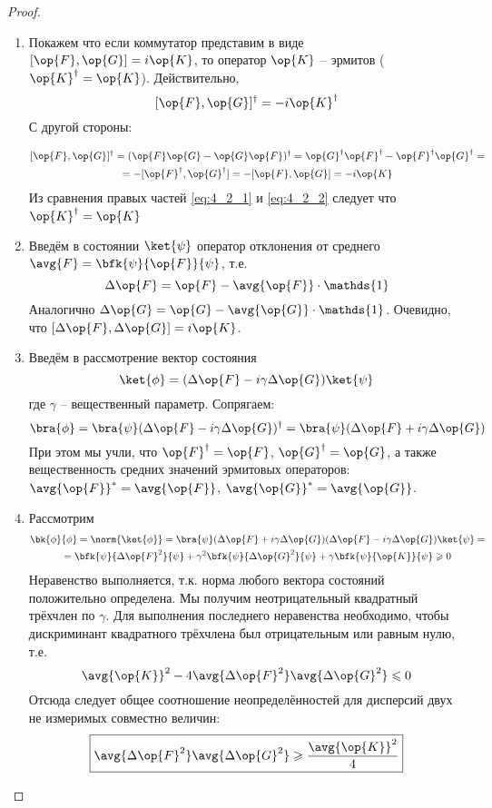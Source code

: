 \begin{proof}
\begin{enumerate}
\item Покажем что если коммутатор представим в виде $[\op{F},\op{G}]=i\op{K}$, то оператор $\op{K}$ -- эрмитов ($\op{K}^\dag=\op{K}$). Действительно,
\begin{equation}
  \label{eq:4_2_1}
  [\op{F},\op{G}]^\dag=-i\op{K}^\dag
\end{equation}%
%
С другой стороны:

\begin{equation}
\begin{gathered}
  \label{eq:4_2_2}
  [\op{F},\op{G}]^\dag= (\op{F}\op{G} - \op{G}\op{F})^\dag =
    \op{G}^\dag \op{F}^\dag - \op{F}^\dag \op{G}^\dag = \\ =
    -[\op{F}^\dag,\op{G}^\dag]= -[\op{F},\op{G}]= -i\op{K}
\end{gathered}
\end{equation}%
%
Из сравнения правых частей \eqref{eq:4_2_1} и \eqref{eq:4_2_2} следует что $\op{K}^\dag=\op{K}$

\item Введём в состоянии $\ket{\psi}$ оператор отклонения от среднего $\avg{F}=\bfk{\psi}{\op{F}}{\psi}$, т.е.
%
$$
  \Delta\op{F}=\op{F}-\avg{\op{F}}\cdot\mathds{1}
$$%
%
Аналогично $\Delta\op{G} = \op{G} - \avg{\op{G}} \cdot \mathds{1}$. Очевидно, что $[\Delta\op{F}, \Delta\op{G}] = i\op{K}$.

\item Введём в рассмотрение вектор состояния
$$
  \ket{\phi}=(\Delta\op{F}-i\gamma\Delta\op{G})\ket{\psi}
$$%
%
где $\gamma$ -- вещественный параметр. Сопрягаем:
$$
  \bra{\phi} = \bra{\psi} (\Delta\op{F} - i\gamma\Delta\op{G})^\dag =
    \bra{\psi} (\Delta\op{F} + i\gamma\Delta\op{G})
$$%
%
При этом мы учли, что $\op{F}^\dag = \op{F}$, $\op{G}^\dag = \op{G}$, а также вещественность средних значений эрмитовых операторов: $\avg{\op{F}}^* = \avg{\op{F}}$, $\avg{\op{G}}^* = \avg{\op{G}}$.

\item Рассмотрим
$$
\begin{gathered}
  \bk{\phi}{\phi} = \norm{\ket{\phi}} =
    \bra{\psi}(\Delta\op{F} + i\gamma\Delta\op{G})
        (\Delta\op{F} - i\gamma\Delta\op{G})\ket{\psi} = \\ =
    \bfk{\psi}{\Delta\op{F}^2}{\psi} + \gamma^2\bfk{\psi}{\Delta\op{G}^2}{\psi} +
      \gamma\bfk{\psi}{\op{K}}{\psi} \geqslant 0
\end{gathered}
$$%
%
Неравенство выполняется, т.к. норма любого вектора состояний положительно определена. Мы получим неотрицательный квадратный трёхчлен по $\gamma$. Для выполнения последнего неравенства необходимо, чтобы дискриминант квадратного трёхчлена был отрицательным или равным нулю, т.е.
$$
  \avg{\op{K}}^2 - 4 \avg{\Delta\op{F}^2} \avg{\Delta\op{G}^2} \leqslant 0
$$%
%
Отсюда следует общее соотношение неопределённостей для дисперсий двух не измеримых совместно величин:
$$
  \boxed{
    \avg{\Delta\op{F}^2} \avg{\Delta\op{G}^2} \geqslant \frac{\avg{\op{K}}^2}{4}
  }
$$


\end{enumerate}
\end{proof}
